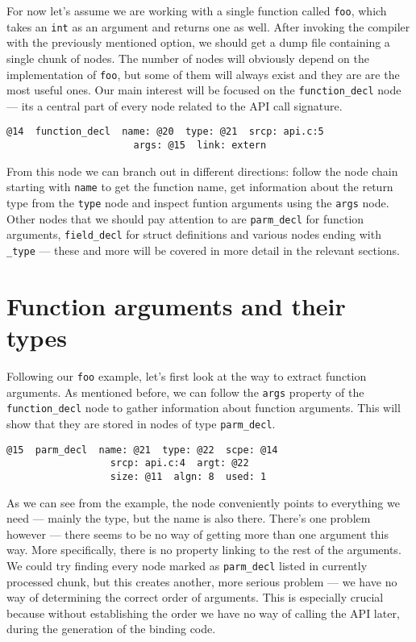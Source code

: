 \documentclass[polish, english]{iithesis}
\begin{document}
For now let's assume we are working with a single function called \texttt{foo}, which takes an \texttt{int} as an argument and returns one as well.
After invoking the compiler with the previously mentioned option, we should get a dump file containing a single chunk of nodes.
The number of nodes will obviously depend on the implementation of \texttt{foo}, but some of them will always exist and they are are the most useful ones.
Our main interest will be focused on the \texttt{function\_decl} node --- its a central part of every node related to the API call signature.
\begin{lstlisting}[caption=Example \texttt{function\_decl} node]
  @14  function_decl  name: @20  type: @21  srcp: api.c:5      
                      args: @15  link: extern
\end{lstlisting}
From this node we can branch out in different directions: follow the node chain starting with \texttt{name} to get the function name, get information about the return type from the \texttt{type} node and inspect funtion arguments using the \texttt{args} node.
Other nodes that we should pay attention to are \texttt{parm\_decl} for function arguments, \texttt{field\_decl} for struct definitions and various nodes ending with \texttt{\_type} --- these and more will be covered in more detail in the relevant sections.
  \section{Function arguments and their types}
Following our \texttt{foo} example, let's first look at the way to extract function arguments.
As mentioned before, we can follow the \texttt{args} property of the \texttt{function\_decl} node to gather information about function arguments.
This will show that they are stored in nodes of type \texttt{parm\_decl}.
\begin{lstlisting}[caption=Example \texttt{parm\_decl} node]
  @15  parm_decl  name: @21  type: @22  scpe: @14     
                  srcp: api.c:4  argt: @22     
                  size: @11  algn: 8  used: 1
\end{lstlisting}
As we can see from the example, the node conveniently points to everything we need --- mainly the type, but the name is also there.
There's one problem however --- there seems to be no way of getting more than one argument this way.
More specifically, there is no property linking to the rest of the arguments. 
We could try finding every node marked as \texttt{parm\_decl} listed in currently processed chunk, but this creates another, more serious problem --- we have no way of determining the correct order of arguments.
This is especially crucial because without establishing the order we have no way of calling the API later, during the generation of the binding code.
\end{document}
